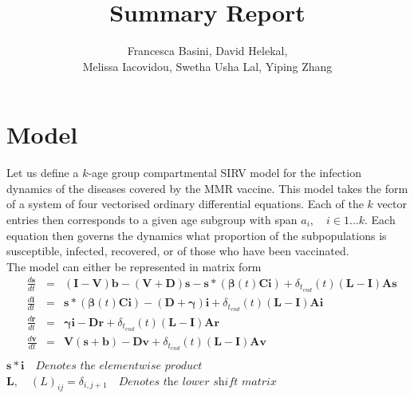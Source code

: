 \documentclass{article}
\title{Summary Report}
\author{Francesca Basini, David Helekal,\\Melissa Iacovidou, Swetha Usha Lal, Yiping Zhang}
\theoremstyle{definition}
\begin{document}
\maketitle
\newpage
\section{Model}

Let us define a $k$-age group compartmental SIRV model for the infection dynamics of the diseases covered by the MMR vaccine. This model takes the form of a system of four vectorised ordinary differential equations. Each of the $k$ vector entries then corresponds to a given age subgroup with span $a_i, \quad i\in1...k$. Each equation then governs the dynamics what proportion of the subpopulations is susceptible, infected, recovered, or of those who have been vaccinated.\\
The model can either be represented in matrix form
\begin{align*}
&\frac{d\mathbf{s}}{dt} &=& (\mathbf{I}-\mathbf{V})\mathbf{b} - (\mathbf{V} + \mathbf{D})\mathbf{s} - \mathbf{s}*(\pmb{\beta}(t)\mathbf{C}\mathbf
{i})+\delta_{t_{end}}(t)(\mathbf{L}-\mathbf{I})\mathbf{A}\mathbf{s}\\
&\frac{d\mathbf{i}}{dt} &=&\mathbf{s}*(\pmb{\beta}(t)\mathbf{C}\mathbf{i}) - (\mathbf{D} + \pmb{\gamma})\mathbf{i}+\delta_{t_{end}}(t)(\mathbf{L}-\mathbf{I})\mathbf{A}\mathbf{i}\\
&\frac{d\mathbf{r}}{dt} &=& \pmb{\gamma}\mathbf{i} - \mathbf{D}\mathbf{r}+\delta_{t_{end}}(t)(\mathbf{L}-\mathbf{I})\mathbf{A}\mathbf{r}\\
&\frac{d\mathbf{v}}{dt} &=& \mathbf{V}(\mathbf{s}+\mathbf{b})-\mathbf{D}\mathbf{v} +\delta_{t_{end}}(t)(\mathbf{L}-\mathbf{I})\mathbf{A}\mathbf{v}\\
\end{align*}
$\mathbf{s}*\mathbf{i}\quad\textit{Denotes the elementwise product}$\\
$\mathbf{L},\quad(L)_{ij}=\delta_{i,j+1}\quad \textit{Denotes the lower shift matrix}$\\
\end{document}
